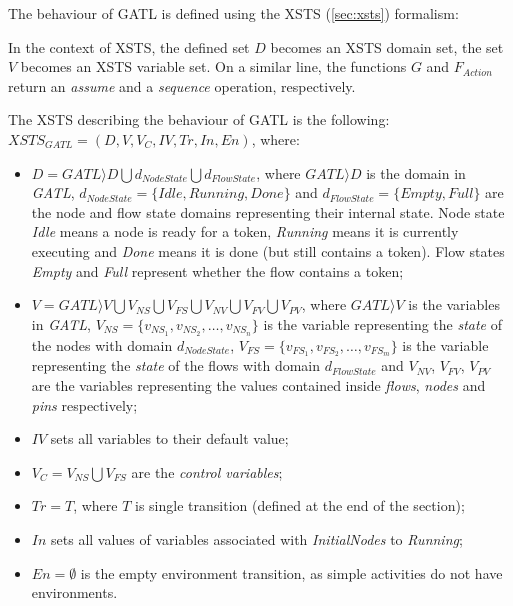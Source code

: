 The behaviour of GATL is defined using the XSTS (\autoref{sec:xsts}) formalism:

\begin{definition}
	
	In the context of XSTS, the defined set \( D \) becomes an XSTS domain set, the set \( V \) becomes an XSTS variable set. On a similar line, the functions \( G \) and \( F_{Action} \) return an \emph{assume} and a \emph{sequence} operation, respectively.
	
	The XSTS describing the behaviour of GATL is the following: \( \mathit{XSTS_{GATL}} = (D, V, V_C, \mathit{IV}, \mathit{Tr}, \mathit{In}, \mathit{En}) \), where:
	
	\begin{itemize}
		\item \( D = \mathit{GATL} \rangle D \bigcup d_\mathit{NodeState} \bigcup d_\mathit{FlowState} \), where \(\mathit{GATL} \rangle D\) is the domain in \emph{GATL}, \(d_\mathit{NodeState} = \{ \mathit{Idle}, \mathit{Running}, \mathit{Done} \} \) and \(d_\mathit{FlowState} = \{ \mathit{Empty}, \mathit{Full} \} \) are the node and flow state domains representing their internal state. Node state \emph{Idle} means a node is ready for a token, \emph{Running} means it is currently executing and \emph{Done} means it is done (but still contains a token). Flow states \emph{Empty} and \emph{Full} represent whether the flow contains a token;
		\item \( V = \mathit{GATL} \rangle V \bigcup V_\mathit{NS} \bigcup V_\mathit{FS} \bigcup V_\mathit{NV} \bigcup V_\mathit{FV} \bigcup V_\mathit{PV} \), where \( \mathit{GATL} \rangle V \) is the variables in \emph{GATL},  \(V_\mathit{NS} = \{ v_\mathit{NS_1}, v_\mathit{NS_2}, \dots, v_\mathit{NS_n} \} \) is the variable representing the \emph{state} of the nodes with domain \(d_\mathit{NodeState}\), \mbox{\(V_\mathit{FS} = \{ v_\mathit{FS_1}, v_\mathit{FS_2}, \dots, v_\mathit{FS_m} \} \)} is the variable representing the \emph{state} of the flows with domain \(d_\mathit{FlowState}\) and \( V_\mathit{NV} \), \( V_\mathit{FV} \), \( V_\mathit{PV} \) are the variables representing the values contained inside \emph{flows}, \emph{nodes} and \emph{pins} respectively;
		\item \( IV \) sets all variables to their default value;
		\item \( V_C = V_\mathit{NS} \bigcup V_\mathit{FS} \) are the \emph{control variables};
		\item \( \mathit{Tr} = T \), where \(T\) is single transition (defined at the end of the section);
		\item \( \mathit{In} \) sets all values of variables associated with \emph{InitialNodes} to \emph{Running};
		\item \( \mathit{En} = \emptyset \) is the empty environment transition, as simple activities do not have environments.
	\end{itemize}
	
\end{definition}\label{def:activity-state}

